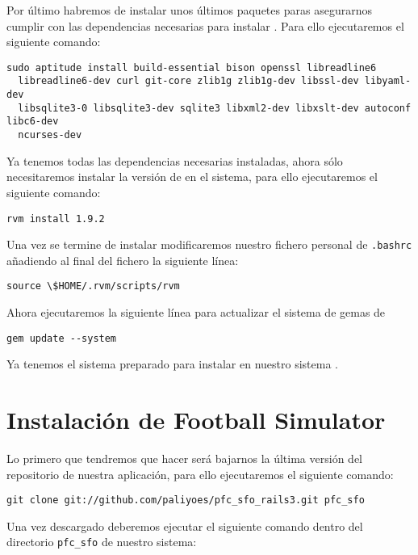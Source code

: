 Por último habremos de instalar unos últimos paquetes paras asegurarnos cumplir
con las dependencias necesarias para instalar . Para ello
ejecutaremos el siguiente comando:

\begin{lstlisting}[style=consola]
  sudo aptitude install build-essential bison openssl libreadline6
  libreadline6-dev curl git-core zlib1g zlib1g-dev libssl-dev libyaml-dev
  libsqlite3-0 libsqlite3-dev sqlite3 libxml2-dev libxslt-dev autoconf libc6-dev
  ncurses-dev
\end{lstlisting}

Ya tenemos todas las dependencias necesarias instaladas, ahora sólo
necesitaremos instalar la versión de  en el sistema, para ello
ejecutaremos el siguiente comando:

\begin{lstlisting}[style=consola]
  rvm install 1.9.2
\end{lstlisting}

Una vez se termine de instalar modificaremos nuestro fichero personal de
\texttt{.bashrc} añadiendo al final del fichero la siguiente línea:

\begin{lstlisting}[style=consola]
  source \$HOME/.rvm/scripts/rvm
\end{lstlisting}

Ahora ejecutaremos la siguiente línea para actualizar el sistema de gemas de

\begin{lstlisting}[style=consola]
  gem update --system
\end{lstlisting}

Ya tenemos el sistema preparado para instalar en nuestro sistema
.

\section{Instalación de Football Simulator}

Lo primero que tendremos que hacer será bajarnos la última versión del
repositorio de nuestra aplicación, para ello ejecutaremos el siguiente comando:

\begin{lstlisting}[style=consola]
  git clone git://github.com/paliyoes/pfc_sfo_rails3.git pfc_sfo
\end{lstlisting}

Una vez descargado deberemos ejecutar el siguiente comando dentro del directorio
\texttt{pfc\_sfo} de nuestro sistema:

